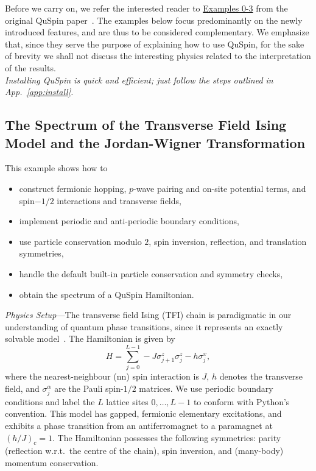 \documentclass{SciPost}
\newcommand\0{\scalebox{-1}[1]{0}}
\begin{document}
\noindent Before we carry on, we refer the interested reader to \href{http://weinbe58.github.io/QuSpin/Examples.html}{Examples 0-3} from the original QuSpin paper~\cite{weinberg_17_quspin}. The examples below focus predominantly on the newly introduced features, and are thus to be considered complementary. We emphasize that, since they serve the purpose of explaining how to use QuSpin, for the sake of brevity we shall not discuss the interesting physics related to the interpretation of the results.\\

\emph{Installing QuSpin is quick and efficient; just follow the steps outlined in App.~\ref{app:install}.}


\subsection{The Spectrum of the Transverse Field Ising Model and the Jordan-Wigner Transformation}
\label{subsec:JW}

This example shows how to
\begin{itemize}
	\item construct fermionic hopping, $p$-wave pairing and on-site potential terms, and spin$-1/2$ interactions and transverse fields,
	\item implement periodic and anti-periodic boundary conditions,
	\item use particle conservation modulo $2$, spin inversion, reflection, and translation symmetries,
	\item handle the default built-in particle conservation and symmetry checks,
	\item obtain the spectrum of a QuSpin Hamiltonian.
\end{itemize}

\noindent\emph{Physics Setup---}The transverse field Ising (TFI) chain is paradigmatic in our understanding of quantum phase transitions, since it represents an exactly solvable model~\cite{sachdev_book}. The Hamiltonian is given by
\begin{equation}
H=\sum_{j=0}^{L-1}-J\sigma^z_{j+1}\sigma^z_j - h\sigma^x_j,
\label{eq:TFIM}
\end{equation} 
where the nearest-neighbour (nn) spin interaction is $J$, $h$ denotes the transverse field, and $\sigma^\alpha_j$ are the Pauli spin-$1/2$ matrices. We use periodic boundary conditions and label the $L$ lattice sites $0,\dots,L-1$ to conform with Python's convention. This model has gapped, fermionic elementary excitations, and exhibits a phase transition from an antiferromagnet to a paramagnet at $\left(h/J\right)_c=1$. The Hamiltonian possesses the following symmetries: parity (reflection w.r.t.~the centre of the chain), spin inversion, and (many-body) momentum conservation.
\end{document}
